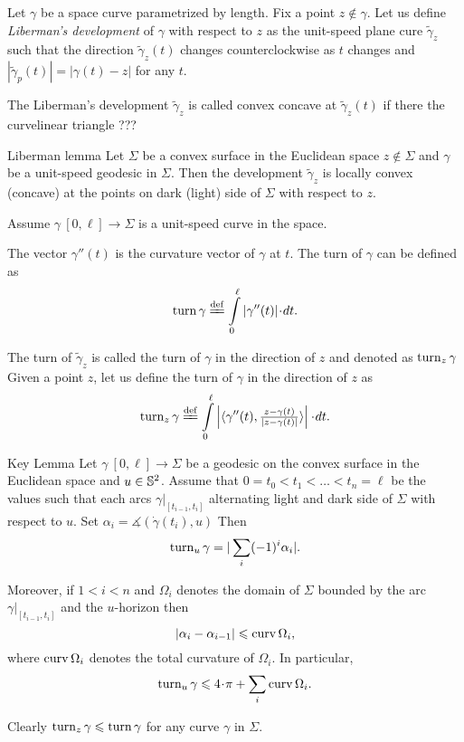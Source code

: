 \documentclass[a4paper,10pt]{amsart}
\begin{document}
Let $\gamma$ be a space curve 
parametrized by length.
Fix a point $z\notin\gamma$. 
Let us define \emph{Liberman's development} of $\gamma$ with respect to $z$ as the unit-speed plane cure $\tilde\gamma_z$ such that the direction $\tilde\gamma_z(t)$
changes counterclockwise as $t$ changes
and
$|\tilde\gamma_p(t)|=|\gamma(t)-z|$ for any $t$.

The Liberman's development $\tilde\gamma_z$ is called convex concave at $\tilde\gamma_z(t)$ if there the curvelinear triangle ??? 


\begin{thm}{Liberman lemma}\label{lem:liberman}
Let $\Sigma$ be a convex surface in the Euclidean space 
$z\not\in\Sigma$ and $\gamma$ be a unit-speed geodesic in $\Sigma$.
Then the development $\tilde\gamma_z$ is locally convex (concave) 
at the points on dark (light) side of $\Sigma$ with respect to $z$.
\end{thm}

Assume $\gamma\:[0,\ell]\to \Sigma$ is a unit-speed curve in the space.

The vector $\gamma''(t)$ is the curvature vector of $\gamma$ at $t$.
The turn of $\gamma$ can be defined as 
\[\turn\gamma\df\int\limits_0^\ell|\gamma''(t)|\cdot dt.\]

The turn of $\tilde\gamma_z$ is called the turn of $\gamma$ in the direction of $z$ and denoted as $\mathop{\rm turn}\nolimits_z\gamma$
Given a point $z$, let us define the turn of $\gamma$ in the direction of $z$ as
\[\turn_z\gamma
\df
\int\limits_0^\ell
\left|
\langle\gamma''(t),\tfrac{z-\gamma(t)}{|z-\gamma(t)|}\rangle
\right|
\cdot dt.\]

\begin{thm}{Key Lemma}
\label{lem:key}
Let $\gamma\:[0,\ell]\to \Sigma$ be a geodesic on the convex surface in the Euclidean space 
and $u\in\mathbb{S}^2$.
Assume that $0=t_0<t_1<\dots<t_n=\ell$ be the values such that each arcs $\gamma|_{[t_{i-1},t_i]}$ alternating light and dark side of $\Sigma$ with respect to $u$.
Set $\alpha_i=\measuredangle(\dot\gamma(t_i),u)$
Then 
\[\mathop{\rm turn}\nolimits_u\gamma=|\sum_i(-1)^i\alpha_i|.\]

Moreover, if $1<i<n$ 
and $\Omega_i$ denotes the domain of $\Sigma$ bounded by the arc $\gamma|_{[t_{i-1},t_i]}$ and the $u$-horizon then 
\[|\alpha_i-\alpha_{i-1}|\leqslant \mathop{\rm curv}\nolimits\Omega_i,\]
where $\mathop{\rm curv}\nolimits\Omega_i$ denotes the total curvature of $\Omega_i$.
In particular,
\[\turn_u\gamma\le 4\cdot\pi+\sum_i\curv\Omega_i.\]
\end{thm}

Clearly $\mathop{\rm turn}\nolimits_z\gamma\leqslant \mathop{\rm turn}\nolimits \gamma$ for any curve $\gamma$ in $\Sigma$.
\end{document}
